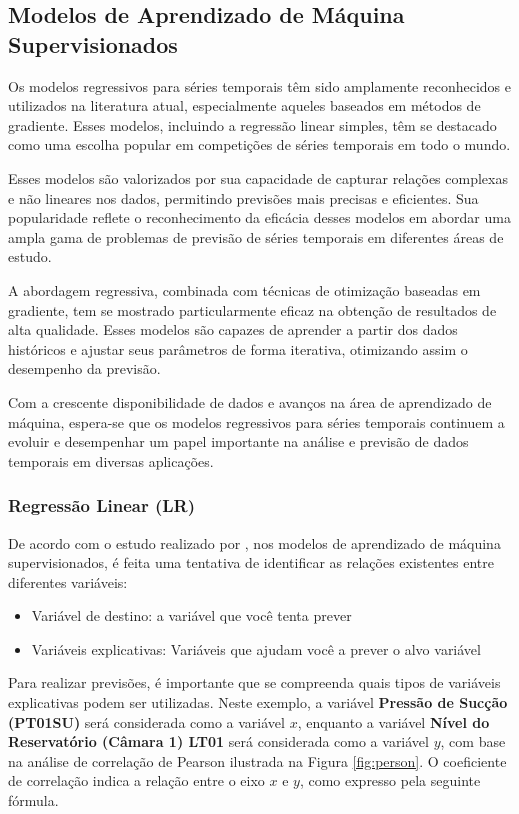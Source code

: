 \subsection{Modelos de Aprendizado de M\'aquina Supervisionados}\label{subsec:reg}

Os modelos regressivos para séries temporais têm sido amplamente reconhecidos e utilizados na literatura atual, especialmente aqueles baseados em métodos de gradiente. Esses modelos, incluindo a regressão linear simples, têm se destacado como uma escolha popular em competições de séries temporais em todo o mundo.

Esses modelos são valorizados por sua capacidade de capturar relações complexas e não lineares nos dados, permitindo previsões mais precisas e eficientes. Sua popularidade reflete o reconhecimento da eficácia desses modelos em abordar uma ampla gama de problemas de previsão de séries temporais em diferentes áreas de estudo.

A abordagem regressiva, combinada com técnicas de otimização baseadas em gradiente, tem se mostrado particularmente eficaz na obtenção de resultados de alta qualidade. Esses modelos são capazes de aprender a partir dos dados históricos e ajustar seus parâmetros de forma iterativa, otimizando assim o desempenho da previsão.

Com a crescente disponibilidade de dados e avanços na área de aprendizado de máquina, espera-se que os modelos regressivos para séries temporais continuem a evoluir e desempenhar um papel importante na análise e previsão de dados temporais em diversas aplicações.

\subsubsection{Regress\~ao Linear (LR)}

De acordo com o estudo realizado por , nos modelos de aprendizado de máquina supervisionados, é feita uma tentativa de identificar as relações existentes entre diferentes variáveis:


\begin{itemize}
	\item Variável de destino: a variável que você tenta prever
	\item Variáveis explicativas: Variáveis que ajudam você a prever o alvo variável
\end{itemize}

Para realizar previsões, é importante que se compreenda quais tipos de variáveis explicativas podem ser utilizadas. Neste exemplo, a variável \textbf{Pressão de Sucção (PT01SU)} será considerada como a variável $x$, enquanto a variável \textbf{Nível do Reservatório (Câmara 1) LT01} será considerada como a variável $y$, com base na análise de correlação de Pearson ilustrada na Figura \ref{fig:person}. O coeficiente de correlação indica a relação entre o eixo $x$ e $y$, como expresso pela seguinte fórmula.



